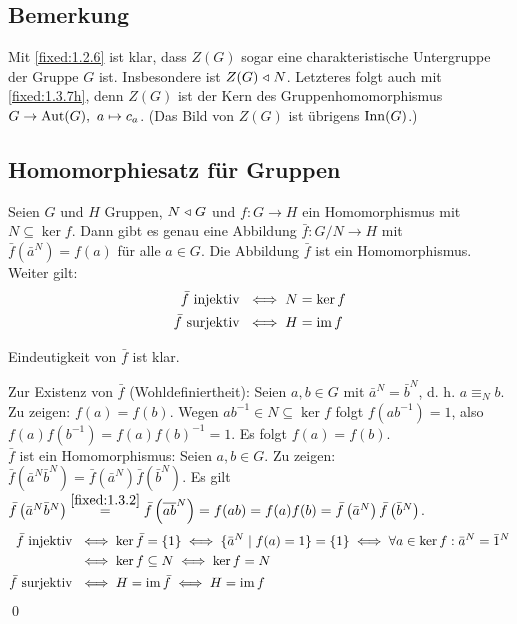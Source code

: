 \subsection{Bemerkung} Mit \ref{fixed:1.2.6} ist klar, dass $Z(G)$ sogar eine charakteristische Untergruppe der Gruppe $G$ ist. Insbesondere ist $Z(G) \mathrel\triangleleft N$. Letzteres folgt auch mit \ref{fixed:1.3.7h}, denn $Z(G)$ ist der Kern des Gruppenhomomorphismus $G\to \operatorname{Aut}(G),~a \mapsto c_a$. (Das Bild von $Z(G)$ ist übrigens $\operatorname{Inn}(G)$.)

\subsection{Homomorphiesatz für Gruppen}  Seien $G$ und $H$ Gruppen, $N \mathrel\triangleleft G$ und $f:G \to H$ ein Homomorphismus mit $N \subseteq \ker f$. Dann gibt es genau eine Abbildung $\bar{f} : G/N \to H$ mit $\bar{f}\left(\bar{a}^N\right) = f(a)$ für alle $a \in G$. Die Abbildung $\bar{f}$ ist ein Homomorphismus. Weiter gilt:
\begin{align*}
	\bar{f} \text{ injektiv } & \iff N=\ker f\\
	\bar{f} \text{ surjektiv } & \iff H=\operatorname{im} f
\end{align*}	 

\proof Eindeutigkeit von $\bar{f}$ ist klar.

Zur Existenz von $\bar{f}$ (Wohldefiniertheit): Seien $a,b \in G$ mit $\bar{a}^N=\bar{b}^N$, d. h. $a \equiv_N b$. Zu zeigen: $f(a)=f(b)$. Wegen $ab^{-1} \in N \subseteq \ker f$ folgt $f(ab^{-1})=1$, also $f(a)f\left(b^{-1}\right)=f(a)f(b)^{-1}=1$. Es folgt $f(a)=f(b)$.\\

$\bar{f}$ ist ein Homomorphismus: Seien $a,b \in G$. Zu zeigen: $\bar{f}\left(\bar{a}^N \bar{b}^N\right)=\bar{f}\left(\bar{a}^N\right) \bar{f}\left(\bar{b}^N\right)$.
Es gilt $\bar{f}\left(\bar{a}^N \bar{b}^N\right) \overset{\ref{fixed:1.3.2}}{=} \bar{f}\left(\overline{ab}^N\right)=f(ab)=f(a)f(b)=\bar{f}\left(\bar{a}^N\right) \bar{f}\left(\bar{b}^N\right)$.
\begin{align*}
	\bar{f} \text{ injektiv } & \iff \ker \bar{f} =\{1\} \iff \{\bar{a}^N \mid f(a)=1\} = \{1\} \iff \forall a \in \ker f: \bar{a}^N=\bar{1}^N \\
 	& \iff \ker f \subseteq N \iff \ker f = N \\
	\bar{f} \text{ surjektiv } & \iff H=\operatorname{im} \bar{f} \iff H=\operatorname{im} f
\end{align*} \qed